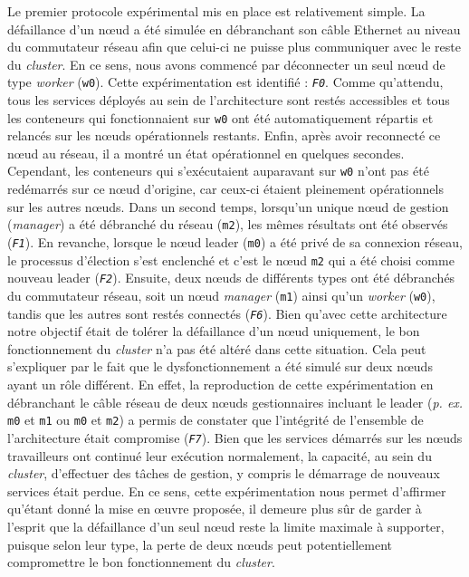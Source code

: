 Le premier protocole expérimental mis en place est relativement simple. La défaillance d'un n\oe{}ud a été simulée en débranchant son câble Ethernet au niveau du commutateur réseau afin que celui-ci ne puisse plus communiquer avec le reste du \textit{cluster}. En ce sens, nous avons commencé par déconnecter un seul n\oe{}ud de type \textit{worker} (\texttt{w0}). Cette expérimentation est identifié : \textit{\texttt{F0}}. Comme qu'attendu, tous les services déployés au sein de l'architecture sont restés accessibles et tous les conteneurs qui fonctionnaient sur \texttt{w0} ont été automatiquement répartis et relancés sur les n\oe{}uds opérationnels restants. Enfin, après avoir reconnecté ce n\oe{}ud au réseau, il a montré un état opérationnel en quelques secondes. Cependant, les conteneurs qui s'exécutaient auparavant sur \texttt{w0} n'ont pas été redémarrés sur ce n\oe{}ud d'origine, car ceux-ci étaient pleinement opérationnels sur les autres n\oe{}uds. Dans un second temps, lorsqu'un unique n\oe{}ud de gestion (\textit{manager}) a été débranché du réseau (\texttt{m2}), les mêmes résultats ont été observés (\textit{\texttt{F1}}). En revanche, lorsque le n\oe{}ud leader (\texttt{m0}) a été privé de sa connexion réseau, le processus d'élection s'est enclenché et c'est le n\oe{}ud \texttt{m2} qui a été choisi comme nouveau leader (\textit{\texttt{F2}}). Ensuite, deux n\oe{}uds de différents types ont été débranchés du commutateur réseau, soit un n\oe{}ud \textit{manager} (\texttt{m1}) ainsi qu'un \textit{worker} (\texttt{w0}), tandis que les autres sont restés connectés (\textit{\texttt{F6}}). Bien qu'avec cette architecture notre objectif était de tolérer la défaillance d'un n\oe{}ud uniquement, le bon fonctionnement du \textit{cluster} n'a pas été altéré dans cette situation. Cela peut s'expliquer par le fait que le dysfonctionnement a été simulé sur deux n\oe{}uds ayant un rôle différent. En effet, la reproduction de cette expérimentation en débranchant le câble réseau de deux n\oe{}uds gestionnaires incluant le leader (\textit{p. ex.} \texttt{m0} et \texttt{m1} ou \texttt{m0} et \texttt{m2}) a permis de constater que l'intégrité de l'ensemble de l'architecture était compromise (\textit{\texttt{F7}}). Bien que les services démarrés sur les n\oe{}uds travailleurs ont continué leur exécution normalement, la capacité, au sein du \textit{cluster}, d'effectuer des tâches de gestion, y compris le démarrage de nouveaux services était perdue. En ce sens, cette expérimentation nous permet d'affirmer qu'étant donné la mise en \oe{}uvre proposée, il demeure plus sûr de garder à l'esprit que la défaillance d'un seul n\oe{}ud reste la limite maximale à supporter, puisque selon leur type, la perte de deux n\oe{}uds peut potentiellement compromettre le bon fonctionnement du \textit{cluster}.

